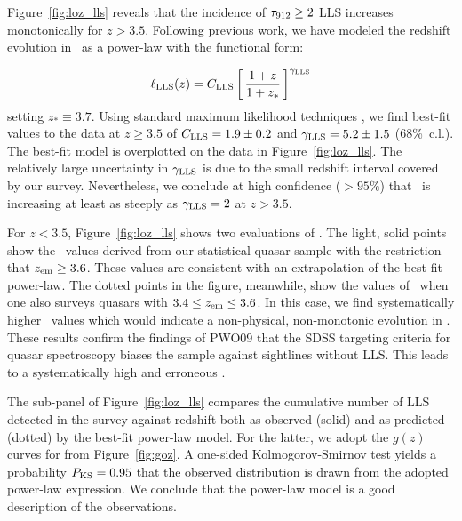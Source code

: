 \documentclass[12pt,preprint]{aastex}
\begin{document}
Figure~\ref{fig:loz_lls} reveals that the incidence of $\tau_{\rm 912} \ge 2$ LLS
increases monotonically for $z>3.5$.
Following previous work, we have modeled the redshift
evolution in \lzlls\ as a power-law with the functional form:

\begin{equation}
\ell_{\rm{LLS}}(z) = C_{\rm LLS} \left [ \, \frac{1+z}{1+z_*} \, \right ]^{\gamma_{\rm LLS}}
\label{eqn:powlaw}
\end{equation}
setting $z_* \equiv 3.7$.
Using standard maximum likelihood techniques
\citep[e.g.][]{sim96}, we find best-fit values 
to the data at $z \ge 3.5$ of
$C_{\rm LLS} = 1.9 \pm 0.2$ and 
$\gamma_{\rm LLS} = 5.2 \pm 1.5$ (68\%\ c.l.).  The best-fit model
is overplotted on the data in Figure~\ref{fig:loz_lls}.
The relatively large uncertainty in $\gamma_{\rm LLS}$
is due to the small redshift interval covered by our survey.
Nevertheless, we conclude at high confidence ($>95\%$)
that \lzlls\ is increasing at least as steeply as $\gamma_{\rm LLS} = 2$
at $z>3.5$.

For $z <3.5$, Figure~\ref{fig:loz_lls} shows two evaluations
of \lzlls.  The light, solid points show the \lzlls\ 
values derived from our statistical quasar sample with
the restriction that $z_{\rm em} \ge 3.6$.  
These values are consistent with an extrapolation
of the best-fit power-law. 
The dotted points in the figure, meanwhile,
show the values of \lzlls\ when one  also surveys
quasars with $3.4 \le z_{\rm em} \le 3.6$.  
In this case, we find systematically higher \lzlls\
values which would indicate a non-physical, non-monotonic 
evolution in \lzlls.  These results confirm the findings
of PWO09 that the SDSS targeting criteria for quasar 
spectroscopy biases the sample against sightlines without LLS.
This leads to a systematically high and erroneous \lzlls.

The sub-panel of Figure~\ref{fig:loz_lls} compares the cumulative number of LLS
detected in the survey against redshift both as observed (solid)
and as predicted (dotted) by the best-fit power-law model.  For the
latter, we adopt the $g(z)$ curves for \sna=2 from Figure~\ref{fig:goz}.
A one-sided Kolmogorov-Smirnov test yields a probability $P_{\rm KS} = 0.95$
that the observed distribution is drawn from the adopted power-law
expression.  We conclude that the power-law model is a good
description of the observations.

\end{document}
